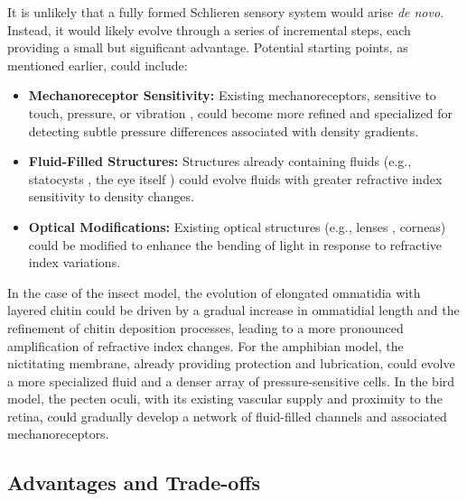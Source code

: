 \documentclass[11pt]{article}
\begin{document}
It is unlikely that a fully formed Schlieren sensory system would arise \textit{de novo}. Instead, it would likely evolve through a series of incremental steps, each providing a small but significant advantage. Potential starting points, as mentioned earlier, could include:
\begin{itemize}
    \item \textbf{Mechanoreceptor Sensitivity:} Existing mechanoreceptors, sensitive to touch, pressure, or vibration \cite{Keil1997InsectMechanoreceptors, Hudspeth1989EarWorks}, could become more refined and specialized for detecting subtle pressure differences associated with density gradients.
    \item \textbf{Fluid-Filled Structures:} Structures already containing fluids (e.g., statocysts \cite{Budelmann1992InvertebrateHearing}, the eye itself \cite{Walls1942VertebrateEye}) could evolve fluids with greater refractive index sensitivity to density changes.
    \item \textbf{Optical Modifications:} Existing optical structures (e.g., lenses \cite{Hecht2017Optics}, corneas) could be modified to enhance the bending of light in response to refractive index variations.
\end{itemize}
In the case of the insect model, the evolution of elongated ommatidia with layered chitin could be driven by a gradual increase in ommatidial length and the refinement of chitin deposition processes, leading to a more pronounced amplification of refractive index changes. For the amphibian model, the nictitating membrane, already providing protection and lubrication, could evolve a more specialized fluid and a denser array of pressure-sensitive cells. In the bird model, the pecten oculi, with its existing vascular supply and proximity to the retina, could gradually develop a network of fluid-filled channels and associated mechanoreceptors.

\subsection{Advantages and Trade-offs}
\end{document}
